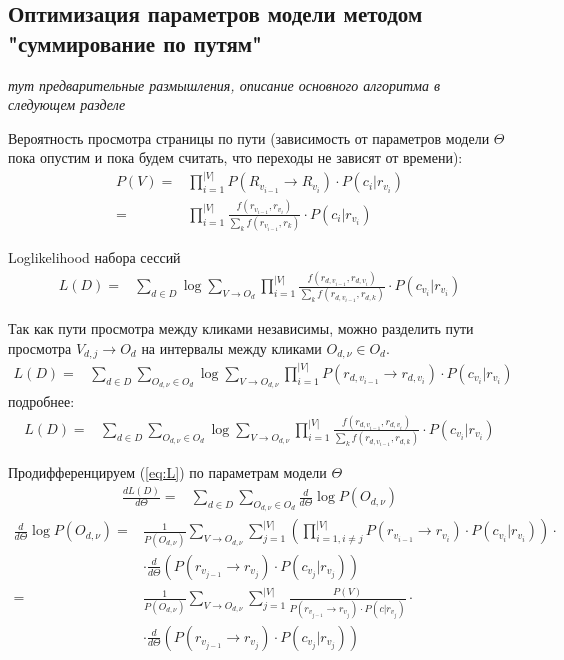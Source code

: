 \documentclass[12pt,a4paper]{article}
\begin{document}
\subsection{Оптимизация параметров модели методом "суммирование по путям"}

{\it тут предварительные размышления, описание основного алгоритма в следующем разделе}

Вероятность просмотра страницы по пути (зависимость от параметров модели $\Theta$ пока опустим и пока будем считать, что переходы не зависят от времени):
\begin{align*}
P(V) = & \prod_{i=1}^{|V|} P(R_{v_{i-1}} \to R_{v_i}) \cdot P(c_i | r_{v_i}) \\
     = & \prod_{i=1}^{|V|} \frac{f(r_{v_{i-1}}, r_{v_i})}{\sum_k f(r_{v_{i-1}}, r_k)} \cdot P(c_i | r_{v_i})
\end{align*}

Loglikelihood набора сессий
\begin{align*}
L(D) = & \sum_{d \in D} \log \sum_{V \to O_d} \prod_{i=1}^{|V|} \frac{f(r_{d,v_{i-1}}, r_{d,v_i})}{\sum_k f(r_{d,v_{i-1}}, r_{d,k})} \cdot P(c_{v_i} | r_{v_i})
\end{align*}

Так как пути просмотра между кликами независимы, можно разделить пути просмотра $V_{d,j} \to O_d$ на интервалы между кликами $O_{d,\nu} \in O_d$.
\begin{align*}
L(D) = & \sum_{d \in D} \sum_{O_{d,\nu} \in O_d} \log \sum_{V \to O_{d,\nu}} \prod_{i=1}^{|V|}
   P(r_{d,v_{i-1}} \to r_{d,v_i}) \cdot P(c_{v_i} | r_{v_i})
\end{align*}
подробнее:
\begin{align}\label{eq:L}
L(D) = & \sum_{d \in D} \sum_{O_{d,\nu} \in O_d} \log \sum_{V \to O_{d,\nu}} \prod_{i=1}^{|V|} \frac{f(r_{d,v_{i-1}}, r_{d,v_i})}{\sum_k f(r_{d,v_{i-1}}, r_{d,k})} \cdot P(c_{v_i} | r_{v_i})
\end{align}

Продифференцируем (\ref{eq:L}) по параметрам модели $\Theta$
\begin{align}
\frac{dL(D)}{d\Theta} = & \sum_{d \in D} \sum_{O_{d,\nu} \in O_d} \frac{d}{d\Theta} \log P(O_{d,\nu})
\end{align}
\begin{align*}
\frac{d}{d\Theta} \log P(O_{d,\nu}) = & \frac{1}{P(O_{d,\nu})} \sum_{V \to O_{d,\nu}} \sum_{j=1}^{|V|}
       \left(
         \prod_{i=1, i \neq j}^{|V|} P(r_{v_{i-1}} \to r_{v_i}) \cdot P(c_{v_i} | r_{v_i})
       \right) \cdot
       \\
       & \cdot \frac{d}{d\Theta}
           \left(
             P(r_{v_{j-1}} \to r_{v_j}) \cdot P(c_{v_j} | r_{v_j})
           \right) \\
  = & \frac{1}{P(O_{d,\nu})} \sum_{V \to O_{d,\nu}} \sum_{j=1}^{|V|}
       \frac{P(V)}{ P(r_{v_{j-1}} \to r_{v_j}) \cdot P(c | r_{v_j}) } \cdot \\
       & \cdot \frac{d}{d\Theta}
           \left(
             P(r_{v_{j-1}} \to r_{v_j}) \cdot P(c_{v_j} | r_{v_j})
           \right)
\end{align*}
\end{document}

